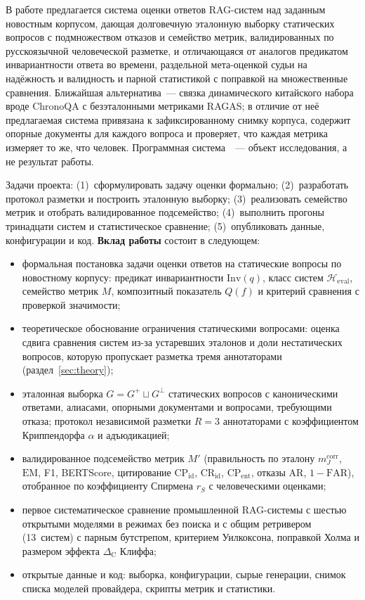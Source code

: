 \documentclass{article}
\newcommand{\Inv}{\mathrm{Inv}}
\newcommand{\Heval}{\mathcal{H}_{\mathrm{eval}}}
\newcommand{\refuse}{\bot}                          %
\newcommand{\EM}{\mathrm{EM}}
\newcommand{\CP}{\mathrm{CP}}
\newcommand{\CR}{\mathrm{CR}}
\newcommand{\AR}{\mathrm{AR}}
\newcommand{\FAR}{\mathrm{FAR}}
\newcommand{\mcorr}{m_J^{\mathrm{corr}}}
\newcommand{\rS}{r_{S}}
\newcommand{\DC}{\Delta_{\mathrm{C}}}
\begin{document}
В работе предлагается система оценки ответов RAG-систем над заданным новостным корпусом, дающая долговечную эталонную выборку статических вопросов с подмножеством отказов и семейство метрик, валидированных по русскоязычной человеческой разметке, и отличающаяся от аналогов предикатом инвариантности ответа во времени, раздельной мета-оценкой судьи на надёжность и валидность и парной статистикой с поправкой на множественные сравнения. Ближайшая альтернатива~--- связка динамического китайского набора вроде ChronoQA с безэталонными метриками RAGAS; в отличие от неё предлагаемая система привязана к зафиксированному снимку корпуса, содержит опорные документы для каждого вопроса и проверяет, что каждая метрика измеряет то же, что человек. Программная система~\cite{bagrov2026digital}~--- объект исследования, а не результат работы.

Задачи проекта: (1)~сформулировать задачу оценки формально; (2)~разработать протокол разметки и построить эталонную выборку; (3)~реализовать семейство метрик и отобрать валидированное подсемейство; (4)~выполнить прогоны тринадцати систем и статистическое сравнение; (5)~опубликовать данные, конфигурации и код. \textbf{Вклад работы} состоит в следующем:
\begin{itemize}
  \item формальная постановка задачи оценки ответов на статические вопросы по новостному корпусу: предикат инвариантности $\Inv(q)$, класс систем $\Heval$, семейство метрик $M$, композитный показатель $Q(f)$ и критерий сравнения с проверкой значимости;
  \item теоретическое обоснование ограничения статическими вопросами: оценка сдвига сравнения систем из-за устаревших эталонов и доли нестатических вопросов, которую пропускает разметка тремя аннотаторами (раздел~\ref{sec:theory});
  \item эталонная выборка $G=G^+\sqcup G^{\refuse}$ статических вопросов с каноническими ответами, алиасами, опорными документами и вопросами, требующими отказа; протокол независимой разметки $R=3$ аннотаторами с коэффициентом Криппендорфа $\alpha$ и адъюдикацией;
  \item валидированное подсемейство метрик $M'$ (правильность по эталону $\mcorr$, $\EM$, F1, BERTScore, цитирование $\CP_{\mathrm{id}}$, $\CR_{\mathrm{id}}$, $\CP_{\mathrm{ent}}$, отказы $\AR$, $1-\FAR$), отобранное по коэффициенту Спирмена $\rS$ с человеческими оценками;
  \item первое систематическое сравнение промышленной RAG-системы с шестью открытыми моделями в режимах без поиска и с общим ретривером (13~систем) с парным бутстрепом, критерием Уилкоксона, поправкой Холма и размером эффекта $\DC$ Клиффа;
  \item открытые данные и код: выборка, конфигурации, сырые генерации, снимок списка моделей провайдера, скрипты метрик и статистики.
\end{itemize}
\end{document}
